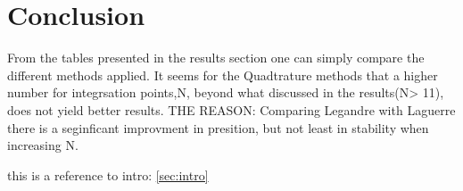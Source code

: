 \documentclass[../main.tex]{subfiles}
\begin{document}
\section{Conclusion} \label{sec:conclusion}
From the tables presented in the results section one can simply compare the different methods applied. It seems for the Quadtrature methods that a higher number for integrsation points,N, beyond what discussed in the results(N> 11), does not yield better results.  THE REASON:
Comparing Legandre with Laguerre there is a seginficant improvment in presition, but not least in stability when increasing N. 

this is a reference to intro: \ref{sec:intro}
\end{document}
